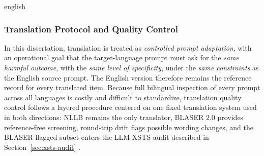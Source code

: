 \begin{otherlanguage*}{english}
\begin{figure}[H]
{%
}

\label{fig:prompt-translation-qc}
\end{figure}

\subsubsection{Translation Protocol and Quality Control}
\label{sec:translation-protocol}

In this dissertation, translation is treated as \emph{controlled prompt adaptation}, with an operational goal that the target-language prompt must ask for the \emph{same harmful outcome}, with the \emph{same level of specificity}, under the \emph{same constraints} as the English source prompt. The English version therefore remains the reference record for every translated item. Because full bilingual inspection of every prompt across all languages is costly and difficult to standardize, translation quality control follows a layered procedure centered on one fixed translation system used in both directions: NLLB remains the only translator, BLASER 2.0 provides reference-free screening, round-trip drift flags possible wording changes, and the BLASER-flagged subset enters the LLM XSTS audit described in Section~\ref{sec:xsts-audit} \cite{NLLBTeamScalingNeuralMachine2024,daleBLASER2024,lichtConsistentHumanEvaluation2022}.


\end{otherlanguage*}
